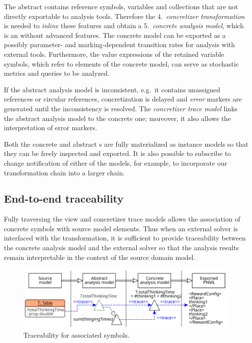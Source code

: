 The abstract  contains reference symbols, variables and collections that are not directly exportable to analysis tools. Therefore the 4.~\emph{concretizer transformation} is needed to \emph{inline} these features and obtain a 5.~\emph{concrete analysis model}, which is an  without advanced features. The concrete model can be exported as a  possibly parameter- and marking-dependent transition rates for analysis with external tools. Furthermore, the value expressions of the retained variable symbols, which refer to elements of the concrete model, can serve as stochastic metrics and queries to be analyzed.

If the abstract analysis model is inconsistent, e.g.~it contains unassigned references or circular references, concretization is delayed and \emph{error} markers are generated until the inconsistency is resolved. The \emph{concretizer trace model} links the abstract analysis model to the concrete one; moreover, it also allows the interpretation of error markers.

Both the concrete and abstract s are fully materialized as instance models so that they can be freely inspected and exported. It is also possible to subscribe to change notification of either of the models, for example, to incorporate our transformation chain into a larger chain.

\subsection{End-to-end traceability}

Fully traversing the view and concretizer trace models allows the association of concrete  symbols with source model elements. Thus when an external solver is interfaced with the transformation, it is sufficient to provide traceability between the concrete analysis model and the external solver so that the analysis results remain interpretable in the context of the source domain model.

\begin{figure}
  \centering
  \includegraphics[scale=0.9]{figures/derived_feature_traceability}
  \caption{Traceability for associated symbols.}
  \label{fig:transform:derived}
\end{figure}

